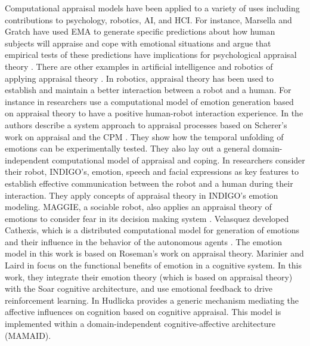 \documentclass[12pt]{report}
\begin{document}
Computational appraisal models have been applied to a variety of uses including
contributions to psychology, robotics, AI, and HCI. For instance, Marsella and
Gratch have used EMA \cite{marsella:ema-process-model} to generate specific
predictions about how human subjects will appraise and cope with emotional
situations and argue that empirical tests of these predictions have implications
for psychological appraisal theory \cite{gratch:assessing-appraisal}
\cite{marsella:assessing-coping}. There are other examples in artificial
intelligence and robotics of applying appraisal theory
\cite{adam:bdi-emotional-companion} \cite{kim:model-hri-appraisal}
\cite{marsella:ema-process-model}. In robotics, appraisal theory has been used
to establish and maintain a better interaction between a robot and a human. For
instance in \cite{kim:model-hri-appraisal} researchers use a computational model
of emotion generation based on appraisal theory to have a positive human-robot
interaction experience. In \cite{sander:systems-approach-appraisal} the authors
describe a system approach to appraisal processes based on Scherer's work on
appraisal and the CPM \cite{scherer:nature-function-emotion}. They show how the
temporal unfolding of emotions can be experimentally tested. They also lay out a
general domain-independent computational model of appraisal and coping. In
\cite{vogiatzis:robot-museum} researchers consider their robot, INDIGO's,
emotion, speech and facial expressions as key features to establish effective
communication between the robot and a human during their interaction. They apply
concepts of appraisal theory in INDIGO's emotion modeling. MAGGIE, a sociable
robot, also applies an appraisal theory of emotions to consider fear in its
decision making system \cite{castro:autonomous-robot-fear}. Velasquez developed
Cathexis, which is a distributed computational model for generation of emotions
and their influence in the behavior of the autonomous agents
\cite{velasquez:emotions-motivations-agents}. The emotion model in this work is
based on Roseman's work on appraisal theory. Marinier and Laird in
\cite{marinier:emotion-reinforcement} focus on the functional benefits of
emotion in a cognitive system. In this work, they integrate their emotion theory
(which is based on appraisal theory) with the Soar cognitive architecture, and
use emotional feedback to drive reinforcement learning. In
\cite{hudlicka:emotinos-reasons} Hudlicka provides a generic mechanism mediating
the affective influences on cognition based on cognitive appraisal. This model
is implemented within a domain-independent cognitive-affective architecture
(MAMAID).
\end{document}
